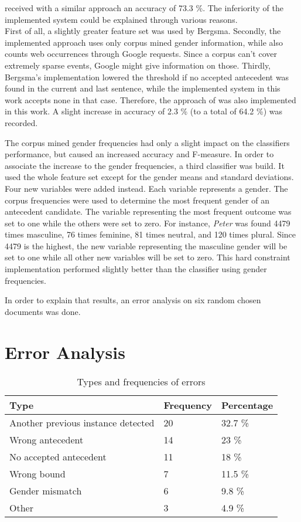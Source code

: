 \cite{bergsma2005automatic} received with a similar approach an accuracy of 73.3 \%. The inferiority of the implemented system could be explained through various reasons. \\
First of all, a slightly greater feature set was used by Bergsma. Secondly, the implemented approach uses only corpus mined gender information, while \cite{bergsma2005automatic} also counts web occurrences through Google requests. Since a corpus can't cover extremely sparse events, Google might give information on those. Thirdly, Bergsma's implementation lowered the threshold if no accepted antecedent was found in the current and last sentence, while the implemented system in this work accepts none in that case. Therefore, the approach of \cite{bergsma2005automatic} was also implemented in this work. A slight increase in accuracy of 2.3 \% (to a total of 64.2 \%) was recorded. 

The corpus mined gender frequencies had only a slight impact on the classifiers performance, but caused an increased accuracy and F-measure. In order to associate the increase to the gender frequencies, a third classifier was build. It used the whole feature set except for the gender means and standard deviations. Four new variables were added instead. Each variable represents a gender. The corpus frequencies were used to determine the most frequent gender of an antecedent candidate. The variable representing the most frequent outcome was set to one while the others were set to zero. For instance, \textit{Peter} was found 4479 times masculine, 76 times feminine, 81 times neutral, and 120 times plural. Since 4479 is the highest, the new variable representing the masculine gender will be set to one while all other new variables will be set to zero. This hard constraint implementation performed slightly better than the classifier using gender frequencies.

In order to explain that results, an error analysis on six random chosen documents was done.

\section{Error Analysis}
\begin{table}[h]
\centering
  \caption{Types and frequencies of errors}
\begin{tabular}{|l|l|l|}
	\hline
	Type & Frequency & Percentage \\ \hline
	\hline
	Another previous instance detected & 20 & 32.7 \% \\ \hline
	Wrong antecedent & 14 & 23 \% \\ \hline
	No accepted antecedent & 11 & 18 \% \\ \hline
	Wrong bound & 7 & 11.5 \% \\ \hline
	Gender mismatch & 6 & 9.8 \% \\ \hline
	Other & 3 & 4.9 \% \\ \hline
	\end{tabular}

     \label{table:errorFreq}
\end{table}


